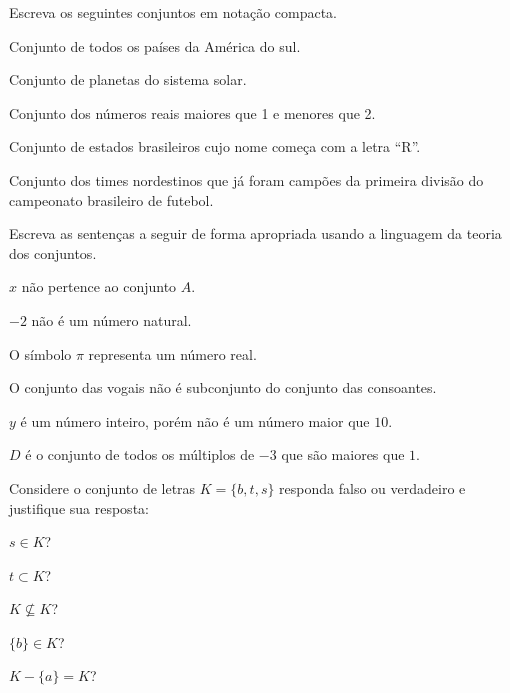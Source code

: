 \begin{questao}\label{test:Conjuntos2}
	Escreva os seguintes conjuntos em notação compacta.
\end{questao}

\begin{exerList}
	\item Conjunto de todos os países da América do sul.
	\item Conjunto de planetas do sistema solar.
	\item Conjunto dos números reais maiores que 1 e menores que 2.
	\item Conjunto de estados brasileiros cujo nome começa com a letra ``R''.
	\item Conjunto dos times nordestinos que já foram campões da primeira divisão do campeonato brasileiro de futebol.
\end{exerList}


\begin{questao}\label{test:Conjuntos3}
	Escreva as sentenças a seguir de forma apropriada usando a linguagem da teoria dos conjuntos.
\end{questao}

\begin{exerList}
	\item $x$ não pertence ao conjunto $A$.
	\item $-2$ não é um número natural.
	\item O símbolo $\pi$ representa um número real.
	\item O conjunto das vogais não é subconjunto do conjunto das consoantes.
	\item $y$ é um número inteiro, porém não é um número maior que $10$.
	\item $D$ é o conjunto de todos os múltiplos de $-3$ que são maiores que $1$.
\end{exerList}

\begin{questao}\label{test:Conjuntos4}
	Considere o conjunto de letras $K = \{b, t, s\}$ responda falso ou verdadeiro e justifique sua resposta:
\end{questao}

\begin{exerList}
	\item $s \in K$?
	\item $t \subset K$?
	\item $K \not\subseteq K$?
	\item $\{b\} \in K$?
	\item $K - \{a\} = K$?
\end{exerList}

